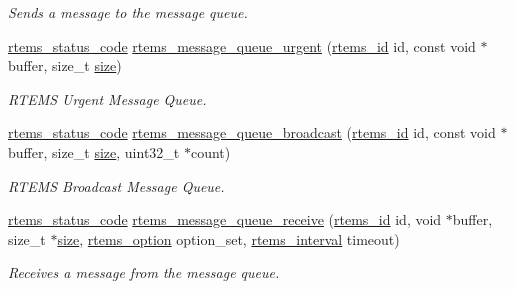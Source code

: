 \begin{DoxyCompactItemize}
\begin{DoxyCompactList}\small\item\em Sends a message to the message queue. \end{DoxyCompactList}\item 
\mbox{\hyperlink{group__ClassicStatus_ga545d41846817eaba6143d52ee4d9e9fe}{rtems\+\_\+status\+\_\+code}} \mbox{\hyperlink{group__ClassicMessageQueue_gadd7dd2cc192e6a9384f1b9aed9501e8c}{rtems\+\_\+message\+\_\+queue\+\_\+urgent}} (\mbox{\hyperlink{group__ClassicTasks_gab20892b814dced7dd4e5b9bf42becd57}{rtems\+\_\+id}} id, const void $\ast$buffer, size\+\_\+t \mbox{\hyperlink{sun4u_2tte_8h_a245260f6f74972558f61b85227df5aae}{size}})
\begin{DoxyCompactList}\small\item\em R\+T\+E\+MS Urgent Message Queue. \end{DoxyCompactList}\item 
\mbox{\hyperlink{group__ClassicStatus_ga545d41846817eaba6143d52ee4d9e9fe}{rtems\+\_\+status\+\_\+code}} \mbox{\hyperlink{group__ClassicMessageQueue_ga5759faf0197e089163a1005f343d8713}{rtems\+\_\+message\+\_\+queue\+\_\+broadcast}} (\mbox{\hyperlink{group__ClassicTasks_gab20892b814dced7dd4e5b9bf42becd57}{rtems\+\_\+id}} id, const void $\ast$buffer, size\+\_\+t \mbox{\hyperlink{sun4u_2tte_8h_a245260f6f74972558f61b85227df5aae}{size}}, uint32\+\_\+t $\ast$count)
\begin{DoxyCompactList}\small\item\em R\+T\+E\+MS Broadcast Message Queue. \end{DoxyCompactList}\item 
\mbox{\hyperlink{group__ClassicStatus_ga545d41846817eaba6143d52ee4d9e9fe}{rtems\+\_\+status\+\_\+code}} \mbox{\hyperlink{group__ClassicMessageQueue_ga98cd2c142b9a2d7d58625d1ad4db5a15}{rtems\+\_\+message\+\_\+queue\+\_\+receive}} (\mbox{\hyperlink{group__ClassicTasks_gab20892b814dced7dd4e5b9bf42becd57}{rtems\+\_\+id}} id, void $\ast$buffer, size\+\_\+t $\ast$\mbox{\hyperlink{sun4u_2tte_8h_a245260f6f74972558f61b85227df5aae}{size}}, \mbox{\hyperlink{group__ClassicOptions_gad26685eb0e60a9650082935c31920e29}{rtems\+\_\+option}} option\+\_\+set, \mbox{\hyperlink{group__ClassicTasks_gad39c43f949683d46874e3a5586b93aee}{rtems\+\_\+interval}} timeout)
\begin{DoxyCompactList}\small\item\em Receives a message from the message queue. \end{DoxyCompactList}\item 

\end{DoxyCompactItemize}
